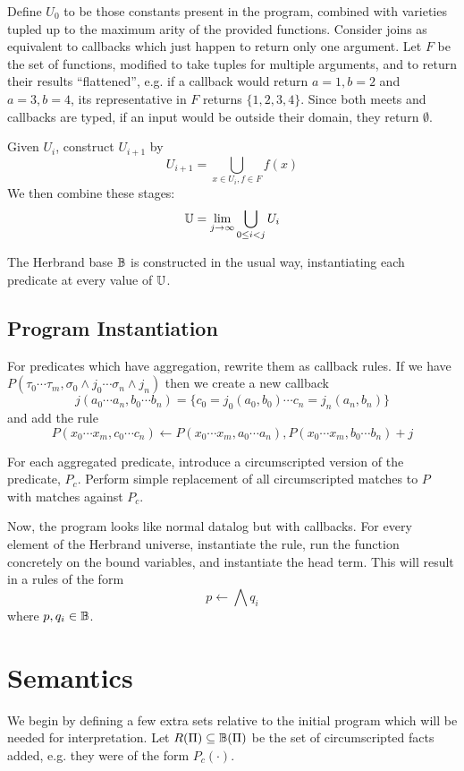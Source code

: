 Define $U_0$ to be those constants present in the program, combined with varieties tupled up to the maximum arity of the provided functions.
Consider joins as equivalent to callbacks which just happen to return only one argument.
Let $F$ be the set of functions, modified to take tuples for multiple arguments, and to return their results ``flattened'', e.g. if a callback would return $a = 1, b = 2$ and $a = 3, b = 4$, its representative in $F$ returns $\{1, 2, 3, 4\}$.
Since both meets and callbacks are typed, if an input would be outside their domain, they return $\emptyset$.

Given $U_i$, construct $U_{i + 1}$ by
\[
	U_{i + 1} = \bigcup_{x \in U_i, f \in F} f(x)
\]
We then combine these stages:
\[
	\mathbb{U} = \lim_{j \rightarrow \infty} \bigcup_{0 \leq i < j} U_i
\]

The Herbrand base $\mathbb{B}$ is constructed in the usual way, instantiating each predicate at every value of $\mathbb{U}$.

\subsection{Program Instantiation}
For predicates which have aggregation, rewrite them as callback rules.
If we have $P(\tau_0 \cdots \tau_m, \sigma_0\wedge j_0 \cdots \sigma_n \wedge j_n)$ then we create a new callback
\[
	j(a_0 \cdots a_n, b_0 \cdots b_n) = \{c_0 = j_0(a_0, b_0) \cdots c_n = j_n(a_n, b_n)\}
\]
and add the rule
\[
	P(x_0 \cdots x_m, c_0 \cdots c_n) \leftarrow P(x_0 \cdots x_m, a_0 \cdots a_n), P(x_0 \cdots x_m, b_0 \cdots b_n) + j
\]

For each aggregated predicate, introduce a circumscripted version of the predicate, $P_c$.
Perform simple replacement of all circumscripted matches to $P$ with matches against $P_c$.

Now, the program looks like normal datalog but with callbacks.
For every element of the Herbrand universe, instantiate the rule, run the function concretely on the bound variables, and instantiate the head term.
This will result in a rules of the form
\[
	p \leftarrow \bigwedge q_i
\]
where $p, q_i \in \mathbb{B}$.

\section{Semantics}
\label{sec:semantics}
We begin by defining a few extra sets relative to the initial program which will be needed for interpretation.
Let $R(\Pi) \subseteq \mathbb{B}(\Pi)$ be the set of circumscripted facts added, e.g. they were of the form $P_c(\cdot)$.

